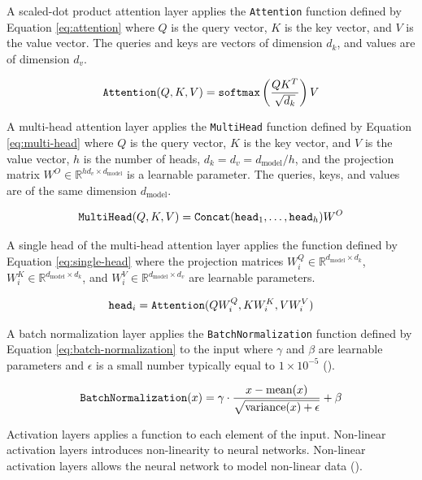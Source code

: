 A scaled-dot product attention layer applies the \verb|Attention| function defined by Equation \ref{eq:attention} where $Q$ is the query vector, $K$ is the key vector, and $V$ is the value vector. The queries and keys are vectors of dimension $d_k$, and values are of dimension $d_v$.

\begin{equation}
    \verb|Attention|(Q, K, V) = \verb|softmax|\left(\frac{QK^T}{\sqrt{d_k}}\right) V
    \label{eq:attention}
\end{equation}

A multi-head attention layer applies the \verb|MultiHead| function defined by Equation \ref{eq:multi-head} where $Q$ is the query vector, $K$ is the key vector, and $V$ is the value vector, $h$ is the number of heads, $d_k = d_v = d_{\text{model}}/h$, and the projection matrix $W^O \in \mathbb{R}^{hd_v \times d_\text{model}}$ is a learnable parameter. The queries, keys, and values are of the same dimension $d_{\text{model}}$.

\begin{equation}
    \verb|MultiHead|(Q, K, V) = \verb|Concat|(\verb|head|_1,\dots,\verb|head|_h)W^O
    \label{eq:multi-head}
\end{equation}

A single head of the multi-head attention layer applies the function defined by Equation \ref{eq:single-head} where the projection matrices $W_i^Q \in \mathbb{R}^{d_\text{model} \times d_k}$, $W_i^K \in \mathbb{R}^{d_\text{model} \times d_k}$, and $W_i^V \in \mathbb{R}^{d_\text{model} \times d_v}$ are learnable parameters.

\begin{equation}
    \verb|head|_i = \verb|Attention|(QW_i^Q, KW_i^K, VW_i^V)
    \label{eq:single-head}
\end{equation}

A batch normalization layer applies the \verb|BatchNormalization| function defined by Equation \ref{eq:batch-normalization} to the input where $\gamma$ and $\beta$ are learnable parameters and $\epsilon$ is a small number typically equal to $1\times 10^{-5}$ (\cite{bjorck2018understanding}).

\begin{equation}
    \verb|BatchNormalization|(x) = \gamma \cdot \frac{x - \text{mean}{(x)}}{\sqrt{\text{variance}(x) + \epsilon}} + \beta
    \label{eq:batch-normalization}
\end{equation}

Activation layers applies a function to each element of the input. Non-linear activation layers introduces non-linearity to neural networks. Non-linear activation layers allows the neural network to model non-linear data (\cite{activation}).

